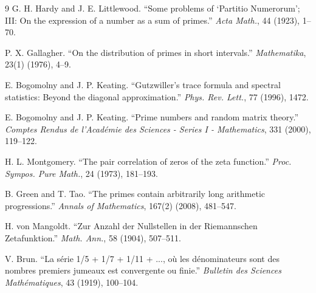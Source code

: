 \documentclass[12pt]{article}
\begin{document}
\begin{thebibliography}{9}
G. H. Hardy and J. E. Littlewood.
``Some problems of `Partitio Numerorum'; III: On the expression of a number
as a sum of primes.''
\emph{Acta Math.}, 44 (1923), 1--70.

P. X. Gallagher.
``On the distribution of primes in short intervals.''
\emph{Mathematika}, 23(1) (1976), 4--9.

E. Bogomolny and J. P. Keating.
``Gutzwiller's trace formula and spectral statistics: Beyond the diagonal
approximation.''
\emph{Phys. Rev. Lett.}, 77 (1996), 1472.

E. Bogomolny and J. P. Keating.
``Prime numbers and random matrix theory.''
\emph{Comptes Rendus de l'Académie des Sciences - Series I - Mathematics}, 331 (2000), 119--122.

H. L. Montgomery.
``The pair correlation of zeros of the zeta function.''
\emph{Proc. Sympos. Pure Math.}, 24 (1973), 181--193.

B. Green and T. Tao.
``The primes contain arbitrarily long arithmetic progressions.''
\emph{Annals of Mathematics}, 167(2) (2008), 481--547.

H. von Mangoldt.
``Zur Anzahl der Nullstellen in der Riemannschen Zetafunktion.''
\emph{Math. Ann.}, 58 (1904), 507--511.

V. Brun.
``La série 1/5 + 1/7 + 1/11 + ..., où les dénominateurs sont des nombres
premiers jumeaux est convergente ou finie.''
\emph{Bulletin des Sciences Mathématiques}, 43 (1919), 100--104.
\end{thebibliography}
\end{document}

